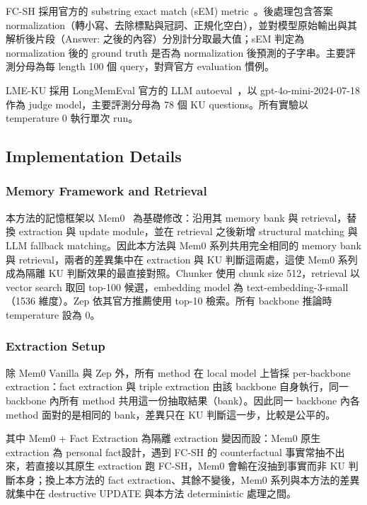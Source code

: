 FC-SH 採用官方的 substring exact match (sEM) metric~\cite{hu2026evaluating}。後處理包含答案 normalization（轉小寫、去除標點與冠詞、正規化空白），並對模型原始輸出與其解析後片段（Answer: 之後的內容）分別計分取最大值；sEM 判定為 normalization 後的 ground truth 是否為 normalization 後預測的子字串。主要評測分母為每 length 100 個 query，對齊官方 evaluation 慣例。
 
LME-KU 採用 LongMemEval 官方的 LLM autoeval~\cite{wulongmemeval}，以 gpt-4o-mini-2024-07-18 作為 judge model，主要評測分母為 78 個 KU questions。所有實驗以 temperature 0 執行單次 run。
 
\subsection{Implementation Details}
\label{subsec:implementation}
 
\subsubsection{Memory Framework and Retrieval}本方法的記憶框架以 Mem0~\cite{chhikara2025mem0} 為基礎修改：沿用其 memory bank 與 retrieval，替換 extraction 與 update module，並在 retrieval 之後新增 structural matching 與 LLM fallback matching。因此本方法與 Mem0 系列共用完全相同的 memory bank 與 retrieval，兩者的差異集中在 extraction 與 KU 判斷這兩處，這使 Mem0 系列成為隔離 KU 判斷效果的最直接對照。Chunker 使用 chunk size 512，retrieval 以 vector search 取回 top-100 候選，embedding model 為 text-embedding-3-small（1536 維度）。Zep 依其官方推薦使用 top-10 檢索。所有 backbone 推論時 temperature 設為 0。
 
\subsubsection{Extraction Setup}除 Mem0 Vanilla 與 Zep 外，所有 method 在 local model 上皆採 per-backbone extraction：fact extraction 與 triple extraction 由該 backbone 自身執行，同一 backbone 內所有 method 共用這一份抽取結果（bank）。因此同一 backbone 內各 method 面對的是相同的 bank，差異只在 KU 判斷這一步，比較是公平的。
 
其中 Mem0 + Fact Extraction 為隔離 extraction 變因而設：Mem0 原生 extraction 為 personal fact設計，遇到 FC-SH 的 counterfactual 事實常抽不出來，若直接以其原生 extraction 跑 FC-SH，Mem0 會輸在沒抽到事實而非 KU 判斷本身；換上本方法的 fact extraction、其餘不變後，Mem0 系列與本方法的差異就集中在 destructive UPDATE 與本方法 deterministic 處理之間。
 

